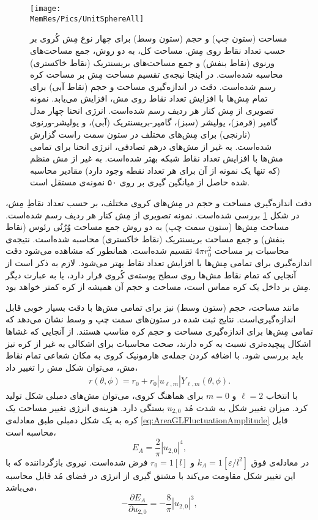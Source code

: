 \begin{figure}[tbp]
\begin{center}
\texttt{[image: \\MemRes/Pics/UnitSphereAll]}
\caption{
مساحت (ستون چپ) و حجم (ستون وسط) برای چهار نوع مِش کُروی بر حسب تعداد نقاط روی مِش. مساحت کل، به دو روش، جمع مساحت‌های ورنوی (نقاط بنفش) و جمع مساحت‌های بریسنتریک (نقاط خاکستری) محاسبه شده‌است. در اینجا نیجه‌ی تقسیم مساحت مِش‌ بر مساحت کره رسم شده‌است. دقت در اندازه‌گیری مساحت و حجم (نقاط آبی) برای تمام مِش‌ها با افزایش تعداد نقاط روی مش، افزایش می‌یابد. نمونه تصویری از مِش کنار هر ردیف رسم شده‌است. انرژی انحنا چهار مدل گامپر (قرمز)، یولیشر (سبز)، گامپر-بریسنتریک (آبی)، و یولیشر-ورنوی (نارنجی) برای مِش‌های مختلف در ستون سمت راست گزارش شده‌است. به غیر از مش‌های درهم تصادفی، انرژی انحنا برای تمامی مش‌ها با افزایش تعداد نقاط شبکه بهتر شده‌است. به غیر از مش منظم (که تنها یک نمونه از آن برای هر تعداد نقطه وجود دارد) مقادیر محاسبه شده حاصل از میانگین گیری بر روی ۵۰ نمونه‌ی مستقل است.
}
\label{fig:unitsphereAll}
\end{center}
\end{figure}

دقت اندازه‌گیری مساحت و حجم در مِش‌های کروی مختلف، بر حسب تعداد نقاطِ مِش، در شکل
\ref{fig:unitsphereAll}
بررسی شده‌است. نمونه تصویری از مِش کنار هر ردیف رسم شده‌است. مساحت مِش‌ها (ستون سمت چپ) به دو روش جمع  مساحت‌ وُرُنُی رئوس (نقاط بنفش) و جمع مساحت بریسنتریک (نقاط خاکستری) محاسبه شده‌است. نتیجه‌ی محاسبات بر مساحت 
$4\pi r_0^2$
 تقسیم شده‌است. همانطور که مشاهده می‌شود دقت اندازه‌گیری برای تمامی مِش‌ها با افزایش تعداد نقاط بهتر می‌شود. لازم به ذکر است  از آنجایی که تمام نقاط مش‌ها روی سطح پوسته‌ی کُروی قرار دارد، یا به عبارت دیگر مِش بر داخل یک کره‌ مماس است، مساحت و حجم آن همیشه از کره کمتر خواهد بود.




مانند مساحت، حجم (ستون وسط) نیز برای تمامی مش‌ها با دقت بسیار خوبی قابل اندازه‌گیری‌است. نتایج ثبت شده در ستون‌های سمت چپ و وسط نشان‌ می‌دهد که تمامی‌ مِش‌ها برای اندازه‌گیری مساحت و حجم کره مناسب هستند. از آنجایی که غشا‌ها اشکال پیچیده‌تری نسبت به کره دارند، صحت محاسبات برای اشکالی به غیر از کره نیز باید بررسی شود. با اضافه کردن جمله‌ی هارمونیک کروی به مکان شعاعی تمام نقاط مش، می‌توان شکل مش را تغییر داد،
\begin{eqnarray}
r(\theta,\phi)=r_0+r_0|u_{\ell,m}|Y_{\ell,m}(\theta,\phi).
\label{eq:rDeformed}
\end{eqnarray}
با انتخاب
$\ell=2$
و
$m=0$
برای هماهنگ‌ کروی، می‌توان مش‌های دمبلی شکل  تولید کرد. میزان تغییر شکل به شدت مُد
$u_{2,0}$
بستگی دارد. هزینه‌ی انرژی تغییر مساحت یک کره به یک شکل دمبلی طبق معادله‌ی
\ref{eq:AreaGLFluctuationAmplitude}
قابل محاسبه ‌است،
\begin{equation}
E_A=\frac{2}{\pi}|u_{2,0}|^4,
\label{eq:AreaEnergyULM20}
\end{equation}
در معادله‌ی فوق 
$k_A=1[\varepsilon/l^2]$
و
$r_0=1[l]$
فرض شده‌است. نیروی بازگرداننده که با این تغییر شکل مقاومت می‌کند با مشتق گیری از انرژی در فضای مُد قابل محاسبه‌ می‌باشد، 
\begin{equation}
-\frac{\partial E_A}{\partial u_{2,0}}=-\frac{8}{\pi}|u_{2,0}|^3,
\label{eq:AreaForceULM20}
\end{equation}


